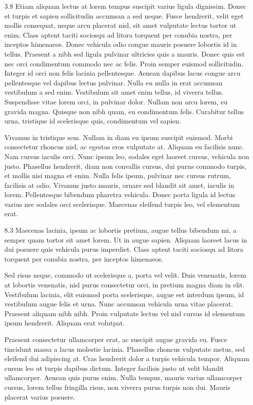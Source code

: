 \documentclass[a0]{a0poster}
\begin{document}
\framethin
\begin{area1}{3.8}
Etiam aliquam lectus at lorem tempus suscipit varius ligula dignissim. Donec et turpis et sapien sollicitudin accumsan a sed neque. Fusce hendrerit, velit eget mollis consequat, neque arcu placerat nisl, sit amet vulputate lectus tortor ut enim. Class aptent taciti sociosqu ad litora torquent per conubia nostra, per inceptos himenaeos. Donec vehicula odio congue mauris posuere lobortis id in tellus. Praesent a nibh sed ligula pulvinar ultricies quis a mauris. Donec quis est nec orci condimentum commodo nec ac felis. Proin semper euismod sollicitudin. Integer id orci non felis lacinia pellentesque. Aenean dapibus lacus congue arcu pellentesque vel dapibus lectus pulvinar. Nulla eu nulla in erat accumsan vestibulum a sed enim. Vestibulum sit amet enim tellus, id viverra tellus. Suspendisse vitae lorem orci, in pulvinar dolor. Nullam non arcu lorem, eu gravida magna. Quisque non nibh quam, eu condimentum felis. Curabitur tellus urna, tristique id scelerisque quis, condimentum vel sapien.

Vivamus in tristique sem. Nullam in diam eu ipsum suscipit euismod. Morbi consectetur rhoncus nisl, ac egestas eros vulputate at. Aliquam eu facilisis nunc. Nam cursus iaculis orci. Nunc ipsum leo, sodales eget laoreet cursus, vehicula non justo. Phasellus hendrerit, diam non convallis cursus, dui purus commodo turpis, et mollis nisi magna et enim. Nulla felis ipsum, pulvinar nec cursus rutrum, facilisis at odio. Vivamus justo mauris, ornare sed blandit sit amet, iaculis in lorem. Pellentesque bibendum pharetra vehicula. Donec porta ligula id lectus varius nec sodales orci scelerisque. Maecenas eleifend turpis leo, vel elementum erat. 
\end{area1}

\framethin
\begin{area1}{8.3}
Maecenas lacinia, ipsum ac lobortis pretium, augue tellus bibendum mi, a semper quam tortor sit amet lorem. Ut in augue sapien. Aliquam laoreet lacus in dui posuere quis vehicula purus imperdiet. Class aptent taciti sociosqu ad litora torquent per conubia nostra, per inceptos himenaeos.

Sed risus neque, commodo ut scelerisque a, porta vel velit. Duis venenatis, lorem at lobortis venenatis, nisl purus consectetur orci, in pretium magna diam in elit. Vestibulum lacinia, elit euismod porta scelerisque, augue est interdum ipsum, id vestibulum augue felis et urna. Nunc accumsan vehicula urna vitae placerat. Praesent aliquam nibh nibh. Proin vulputate lectus vel nisl cursus id elementum ipsum hendrerit. Aliquam erat volutpat.

Praesent consectetur ullamcorper erat, ac suscipit augue gravida eu. Fusce tincidunt massa a lacus molestie lacinia. Phasellus rhoncus vulputate metus, sed eleifend dui adipiscing at. Cras hendrerit dolor a turpis vehicula tempor. Aliquam cursus leo ut turpis dapibus dictum. Integer facilisis justo ut velit blandit ullamcorper. Aenean quis purus enim. Nulla tempus, mauris varius ullamcorper cursus, lorem tellus fringilla risus, non viverra purus turpis non dui. Mauris placerat varius posuere. 
\end{area1}
\end{document}
